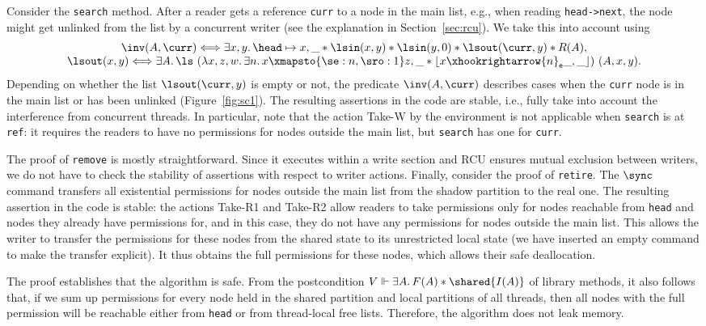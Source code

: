 Consider the {\tt search} method. After a reader gets a reference {\tt curr} to
a node in the main list, e.g., when reading \verb|head->next|, the node might
get unlinked from the list by a concurrent writer (see the explanation in
Section~\ref{sec:rcu}). We take this into account using
$$
\begin{array}{@{}c@{}}
\inv(A, \curr) \Longleftrightarrow 
\exists x,y.\, 
\head \mapsto x,\_ * \lsin(x, y) * \lsin(y, 0) * 
\lsout(\curr,y) * R(A), 
\\
\lsout(x, y) \Longleftrightarrow 
\exists A.\, \ls\ 
(\lambda x,z,w.\,\exists n.\, x \xmapsto{\se:n,\sro:1} z, \_* 
\lfloor x \xhookrightarrow{n}_{\sf e} \_, \_ \rfloor)\ (A, x, y).
\end{array}
$$
Depending on whether the list $\lsout(\curr,y)$ is empty or not, the predicate
$\inv(A, \curr)$ describes cases when the {\tt curr} node is in the main list or
has been unlinked (Figure~\ref{fig:sc1}). The resulting assertions in the code
are stable, i.e., fully take into account the interference from concurrent
threads. In particular, note that the action {\sf Take-W} by the environment is
not applicable when {\tt search} is at {\tt ref}: it requires the readers to
have no permissions for nodes outside the main list, but {\tt search} has one
for {\tt curr}.

The proof of {\tt remove} is mostly straightforward. Since it executes within a
write section and RCU ensures mutual exclusion between writers, we do not have
to check the stability of assertions with respect to writer actions. Finally,
consider the proof of {\tt retire}. The $\sync$ command transfers all
existential permissions for nodes outside the main list from the shadow
partition to the real one. The resulting assertion in the code is stable: the
actions \textsf{Take-R1} and \textsf{Take-R2} allow readers to take permissions
only for nodes reachable from {\tt head} and nodes they already have
permissions for, and in this case, they do not have any permissions for nodes
outside the main list. This allows the writer to transfer the permissions for
these nodes from the shared state to its unrestricted local state (we have
inserted an empty command to make the transfer explicit). It thus obtains the
full permissions for these nodes, which allows their safe deallocation.

The proof establishes that the algorithm is safe. From the postcondition
$V\Vdash\exists A.\, F(A) * \shared{I(A)}$ of library methods, it also follows
that, if we sum up permissions for every node held in the shared partition and
local partitions of all threads, then all nodes with the full permission will be
reachable either from {\tt head} or from thread-local free lists. Therefore, the
algorithm does not leak memory.

